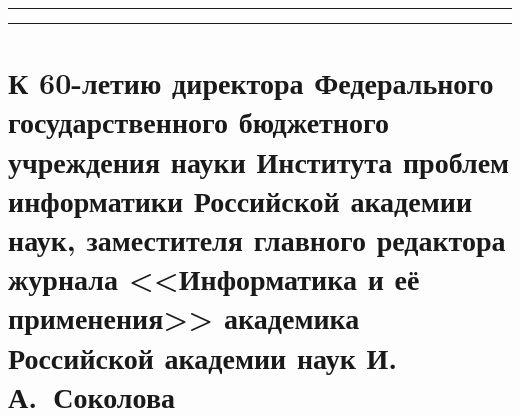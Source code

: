 \hrule

\vspace*{2pt}

\hrule

\vspace*{6pt}



\section*{К 60-летию директора Федерального государственного
бюджетного учреждения науки Института проблем
информатики Российской академии наук,
заместителя главного редактора журнала
<<Информатика и её применения>> академика
Российской академии наук И.\,А.~Соколова}

\vspace*{6pt}







